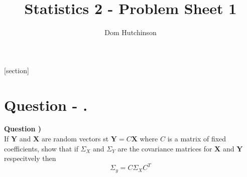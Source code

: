 \documentclass[11pt,a4paper]{article}
\begin{document}
\pagestyle{fancy}
\setlength\parindent{0pt}
\allowdisplaybreaks

\renewcommand{\headrulewidth}{0pt}

\title{Statistics 2 - Problem Sheet 1}
\author{Dom Hutchinson}
\maketitle

\fancyhead[R]{\today}

[section]

\newcommand{\dotprod}[0]{\boldsymbol{\cdot}}
\newcommand{\cosech}[0]{\mathrm{cosech}\ }
\newcommand{\cosec}[0]{\mathrm{cosec}\ }
\newcommand{\sech}[0]{\mathrm{sech}\ }
\newcommand{\prob}[0]{\mathbb{P}}
\newcommand{\nats}[0]{\mathbb{N}}
\newcommand{\cov}[0]{\mathrm{cov}}
\newcommand{\var}[0]{\mathrm{var}}
\newcommand{\expect}[0]{\mathbb{E}}
\newcommand{\reals}[0]{\mathbb{R}}
\newcommand{\integers}[0]{\mathbb{Z}}
\newcommand{\indicator}[0]{\mathds{1}}
\newcommand{\nb}[0]{\textit{N.B.} }
\newcommand{\ie}[0]{\textit{i.e.} }
\newcommand{\eg}[0]{\textit{e.g.} }
\newcommand{\iid}[0]{\overset{\text{iid}}{\sim} }
\newcommand{\x}[0]{\textbf{x} }
\newcommand{\X}[0]{\textbf{X} }

\newcommand{\qpart}[0]{\stepcounter{qpart} \textbf{Question \arabic{section} \alph{qpart})\\}}
\newcommand{\qpartnb}[0]{\stepcounter{qpart} \textbf{Question \arabic{section} \alph{qpart})} - }
\newcommand{\ans}[0]{ \textbf{Answer \arabic{section}\\}}
\newcommand{\apart}[0]{ \textbf{Answer \arabic{section} \alph{qpart})\\}}
\newcommand{\apartnb}[0]{\stepcounter{qpart} \textbf{Answer \arabic{section} \alph{qpart})} - }
\newcommand{\question}[0]{\section*{Question - .}}

\question

\qpart
If $\textbf{Y}$ and $\textbf{X}$ are random vectors st $\textbf{Y}=C\textbf{X}$ where $C$ is a matrix of fixed coefficients, show that if $\Sigma_X$ and $\Sigma_Y$ are the covariance matrices for $\textbf{X}$ and $\textbf{Y}$ respecitvely then
$$\Sigma_y=C\Sigma_XC^T$$
\end{document}
